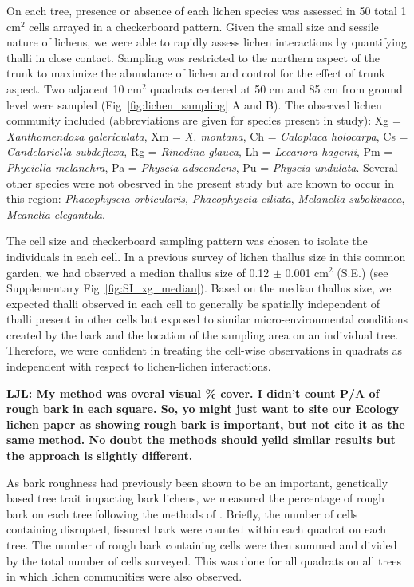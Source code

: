 \documentclass[9pt,twocolumn,twoside,lineno]{pnas-new}
\begin{document}
{On each tree, presence or absence of each lichen species was assessed
in 50 total 1 cm$^2$ cells arrayed in a checkerboard pattern. Given
the small size and sessile nature of lichens, we were able to rapidly
assess lichen interactions by quantifying thalli in close
contact. Sampling was restricted to the northern aspect of the trunk
to maximize the abundance of lichen and control for the effect of
trunk aspect. Two adjacent 10 cm$^2$ quadrats centered at 50 cm and 85
cm from ground level were sampled (Fig~\ref{fig:lichen_sampling} A and
B). The observed lichen community included (abbreviations are given
for species present in study): Xg = \textit{Xanthomendoza
  galericulata}, Xm = \textit{X. montana}, Ch = \textit{Caloplaca
  holocarpa}, Cs = \textit{Candelariella subdeflexa}, Rg =
\textit{Rinodina glauca}, Lh = \textit{Lecanora hagenii}, Pm =
\textit{Phyciella melanchra}, Pa = \textit{Physcia adscendens}, Pu =
\textit{Physcia undulata}. Several other species were not obesrved in
the present study but are known to occur in this region:
\textit{Phaeophyscia orbicularis}, \textit{Phaeophyscia ciliata},
\textit{Melanelia subolivacea}, \textit{Meanelia elegantula}.


The cell size and checkerboard sampling pattern was chosen to isolate
the individuals in each cell. In a previous survey of lichen thallus
size in this common garden, we had observed a median thallus size of
0.12 $\pm$ 0.001 cm$^2$ (S.E.) (see Supplementary
Fig~\ref{fig:SI_xg_median}). Based on the median thallus size, we
expected thalli observed in each cell to generally be spatially
independent of thalli present in other cells but exposed to similar
micro-environmental conditions created by the bark and the location of
the sampling area on an individual tree. Therefore, we were confident
in treating the cell-wise observations in quadrats as independent with
respect to lichen-lichen interactions.

\textbf{LJL: My method was overal visual \% cover. I didn’t count P/A
  of rough bark in each square. So, yo might just want to site our
  Ecology lichen paper as showing rough bark is important, but not
  cite it as the same method. No doubt the methods should yeild
  similar results but the approach is slightly different.}


As bark roughness had previously been shown to be an important,
genetically based tree trait impacting bark lichens, we measured the
percentage of rough bark on each tree following the methods of
\citep{Lamit2011}. Briefly, the number of cells containing disrupted,
fissured bark were counted within each quadrat on each tree. The
number of rough bark containing cells were then summed and divided by
the total number of cells surveyed. This was done for all quadrats on
all trees in which lichen communities were also observed.


}
\end{document}
